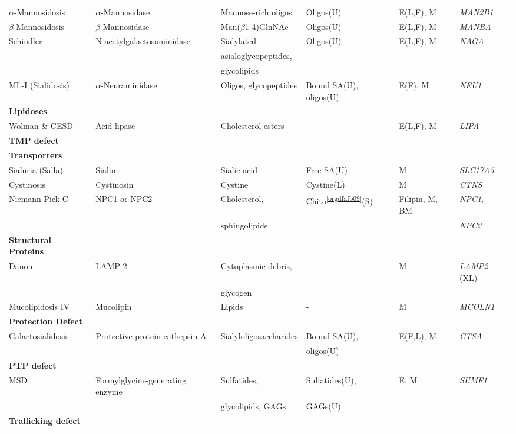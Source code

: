 \documentclass[landscape]{article}
\begin{document}
\begin{longtable}{llllll}
\(\alpha\)-Mannosidosis & \(\alpha\)-Mannosidase & Mannose-rich oligos & Oligos(U) & E(L,F), M & \emph{MAN2B1}\\
\(\beta\)-Mannosidosis & \(\beta\)-Mannosidase & Man(\(\beta\)1-4)GlnNAc & Oligos(U) & E(L,F), M & \emph{MANBA}\\
Schindler & N-acetylgalactosaminidase & Sialylated & Oligos(U) & E(L,F), M & \emph{NAGA}\\
 &  & asialoglycopeptides, &  &  & \\
 &  & glycolipids &  &  & \\
ML-I (Sialidosis) & \(\alpha\)-Neuraminidase & Oligos, glycopeptides & Bound SA(U), oligos(U) & E(F), M & \emph{NEU1}\\
\hline
\textbf{Lipidoses} &  &  &  &  & \\
Wolman \& CESD & Acid lipase & Cholesterol esters & - & E(L,F), M & \emph{LIPA}\\
\hline
\textbf{TMP defect} &  &  &  &  & \\
\textbf{Transporters} &  &  &  &  & \\
Sialuria (Salla) & Sialin & Sialic acid & Free SA(U) & M & \emph{SLC17A5}\\
Cystinosis & Cystinosin & Cystine & Cystine(L) & M & \emph{CTNS}\\
Niemann-Pick C & NPC1 or NPC2 & Cholesterol, & Chito\textsuperscript{\ref{orgdfafb09}}(S) & Filipin, M, BM & \emph{NPC1},\\
 &  & sphingolipids &  &  & \emph{NPC2}\\
\textbf{Structural Proteins} &  &  &  &  & \\
Danon & LAMP-2 & Cytoplasmic debris, & - & M & \emph{LAMP2} (XL)\\
 &  & glycogen &  &  & \\
Mucolipidosis IV & Mucolipin & Lipids & - & M & \emph{MCOLN1}\\
\hline
\textbf{Protection Defect} &  &  &  &  & \\
Galactosialidosis & Protective protein cathepsin A & Sialyloligosaccharides & Bound SA(U), & E(F,L)\footnotemark, M & \emph{CTSA}\\
 &  &  & oligos(U) &  & \\
\hline
\textbf{PTP defect} &  &  &  &  & \\
MSD & Formylglycine-generating enzyme & Sulfatides, & Sulfatides(U), & E\footnotemark, M & \emph{SUMF1}\\
 &  & glycolipids, GAGs & GAGs(U) &  & \\
\hline
\textbf{Trafficking defect} &  &  &  &  & \\

\end{longtable}
\end{document}
